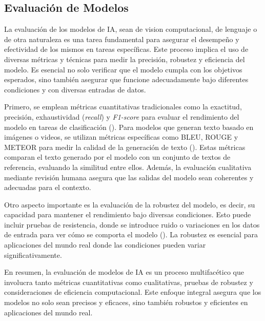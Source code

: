 \subsection{Evaluación de Modelos}

La evaluación de los modelos de IA, sean de vision computacional, de lenguaje o de otra naturaleza es una tarea fundamental para asegurar el desempeño y efectividad de los mismos en tareas específicas. Este proceso implica el uso de diversas métricas y técnicas para medir la precisión, robustez y eficiencia del modelo. Es esencial no solo verificar que el modelo cumpla con los objetivos esperados, sino también asegurar que funcione adecuadamente bajo diferentes condiciones y con diversas entradas de datos.

Primero, se emplean métricas cuantitativas tradicionales como la exactitud, precisión, exhaustividad (\textit{recall}) y \textit{F1-score} para evaluar el rendimiento del modelo en tareas de clasificación (\cite{jurafsky2000speech}). Para modelos que generan texto basado en imágenes o videos, se utilizan métricas específicas como BLEU, ROUGE y METEOR para medir la calidad de la generación de texto (\cite{papineni2002bleu}). Estas métricas comparan el texto generado por el modelo con un conjunto de textos de referencia, evaluando la similitud entre ellos. Además, la evaluación cualitativa mediante revisión humana asegura que las salidas del modelo sean coherentes y adecuadas para el contexto.

Otro aspecto importante es la evaluación de la robustez del modelo, es decir, su capacidad para mantener el rendimiento bajo diversas condiciones. Esto puede incluir pruebas de resistencia, donde se introduce ruido o variaciones en los datos de entrada para ver cómo se comporta el modelo (\cite{hendrycks2019benchmarking}). La robustez es esencial para aplicaciones del mundo real donde las condiciones pueden variar significativamente.

En resumen, la evaluación de modelos de IA es un proceso multifacético que involucra tanto métricas cuantitativas como cualitativas, pruebas de robustez y consideraciones de eficiencia computacional. Este enfoque integral asegura que los modelos no solo sean precisos y eficaces, sino también robustos y eficientes en aplicaciones del mundo real.

